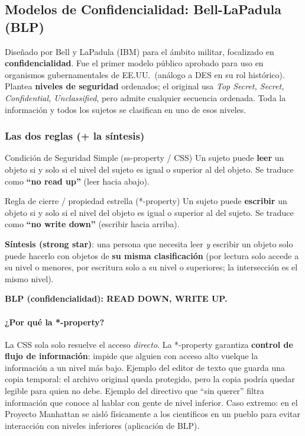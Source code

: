 \documentclass[../main.tex]{subfiles}
\begin{document}
\subsection{Modelos de Confidencialidad: Bell-LaPadula (BLP)}

Diseñado por Bell y LaPadula (IBM) para el ámbito militar, focalizado en \textbf{confidencialidad}. Fue el primer modelo público aprobado para uso en organismos gubernamentales de EE.UU.\ (análogo a DES en su rol histórico). Plantea \textbf{niveles de seguridad} ordenados; el original usa \emph{Top Secret, Secret, Confidential, Unclassified}, pero admite cualquier secuencia ordenada. Toda la información y todos los sujetos se clasifican en uno de esos niveles.

\subsubsection{Las dos reglas (+ la síntesis)}

\begin{definicion}{Condición de Seguridad Simple (ss-property / CSS)}
Un sujeto puede \textbf{leer} un objeto si y solo si el nivel del sujeto es igual o superior al del objeto. Se traduce como \textbf{``no read up''} (leer hacia abajo).
\end{definicion}

\begin{definicion}{Regla de cierre / propiedad estrella (*-property)}
Un sujeto puede \textbf{escribir} un objeto si y solo si el nivel del objeto es igual o superior al del sujeto. Se traduce como \textbf{``no write down''} (escribir hacia arriba).
\end{definicion}

\textbf{Síntesis (strong star)}: una persona que necesita leer \emph{y} escribir un objeto solo puede hacerlo con objetos de \textbf{su misma clasificación} (por lectura solo accede a su nivel o menores, por escritura solo a su nivel o superiores; la intersección es el mismo nivel).

\begin{center}
\textbf{BLP (confidencialidad): READ DOWN, WRITE UP.}
\end{center}

\paragraph{¿Por qué la *-property?} La CSS sola solo resuelve el acceso \emph{directo}. La *-property garantiza \textbf{control de flujo de información}: impide que alguien con acceso alto vuelque la información a un nivel más bajo. Ejemplo del editor de texto que guarda una copia temporal: el archivo original queda protegido, pero la copia podría quedar legible para quien no debe. Ejemplo del directivo que ``sin querer'' filtra información que conoce al hablar con gente de nivel inferior. Caso extremo: en el Proyecto Manhattan se aisló físicamente a los científicos en un pueblo para evitar interacción con niveles inferiores (aplicación de BLP).
\end{document}
